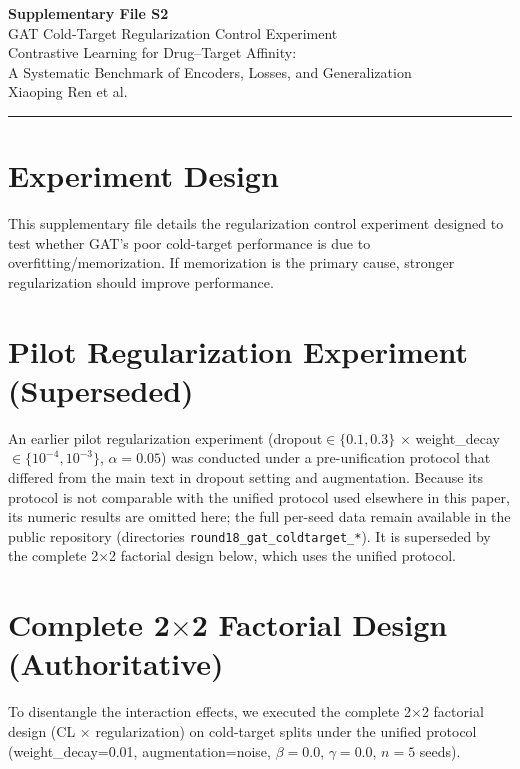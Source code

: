 \documentclass[10pt,a4paper]{article}
\begin{document}
\begin{center}
{\Large\bfseries Supplementary File S2}\\[0.5em]
{\large GAT Cold-Target Regularization Control Experiment}\\[1em]
Contrastive Learning for Drug--Target Affinity:\\A Systematic Benchmark of Encoders, Losses, and Generalization\\[0.5em]
Xiaoping Ren et al.
\end{center}

\noindent\rule{\linewidth}{1pt}
\vspace{1em}

\section{Experiment Design}

This supplementary file details the regularization control experiment designed to test whether GAT's poor cold-target performance is due to overfitting/memorization. If memorization is the primary cause, stronger regularization should improve performance.

\section{Pilot Regularization Experiment (Superseded)}

An earlier pilot regularization experiment (dropout$\in\{0.1,0.3\}$ $\times$ weight\_decay$\in\{10^{-4},10^{-3}\}$, $\alpha=0.05$) was conducted under a pre-unification protocol that differed from the main text in dropout setting and augmentation. Because its protocol is not comparable with the unified protocol used elsewhere in this paper, its numeric results are omitted here; the full per-seed data remain available in the public repository (directories \texttt{round18\_gat\_coldtarget\_*}). It is superseded by the complete 2$\times$2 factorial design below, which uses the unified protocol.

\section{Complete 2$\times$2 Factorial Design (Authoritative)}

To disentangle the interaction effects, we executed the complete 2$\times$2 factorial design (CL $\times$ regularization) on cold-target splits under the unified protocol (weight\_decay=0.01, augmentation=noise, $\beta=0.0$, $\gamma=0.0$, $n=5$ seeds).
\end{document}
